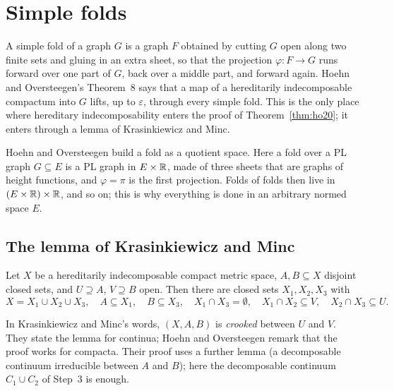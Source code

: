 \chapter{Simple folds}\label{ch:folds}

A simple fold of a graph $G$ is a graph $F$ obtained by cutting $G$ open along two finite sets and gluing in an extra sheet, so that the projection
$\varphi\colon F\to G$ runs forward over one part of $G$, back over a middle part, and forward again. Hoehn and Oversteegen's Theorem~8 says that a
map of a hereditarily indecomposable compactum into $G$ lifts, up to $\varepsilon$, through every simple fold. This is the only place where hereditary
indecomposability enters the proof of Theorem~\ref{thm:ho20}; it enters through a lemma of Krasinkiewicz and Minc.

Hoehn and Oversteegen build a fold as a quotient space. Here a fold over a PL graph $G\subseteq E$ is a PL graph in $E\times\mathbb{R}$, made of three sheets that
are graphs of height functions, and $\varphi=\pi$ is the first projection. Folds of folds then live in $(E\times\mathbb{R})\times\mathbb{R}$, and so on; this is why
everything is done in an arbitrary normed space $E$.

\section{The lemma of Krasinkiewicz and Minc}

\begin{lemma}\label{lem:km}
Let $X$ be a hereditarily indecomposable compact metric space, $A,B\subseteq X$ disjoint closed sets, and $U\supseteq A$, $V\supseteq B$ open. Then there are closed
sets $X_1,X_2,X_3$ with
\[
X=X_1\cup X_2\cup X_3,\quad A\subseteq X_1,\quad B\subseteq X_3,\quad X_1\cap X_3=\emptyset,\quad X_1\cap X_2\subseteq V,\quad X_2\cap X_3\subseteq U.
\]
\end{lemma}

In Krasinkiewicz and Minc's words, $(X,A,B)$ is \emph{crooked} between $U$ and $V$. They state the lemma for continua; Hoehn and Oversteegen remark
that the proof works for compacta. Their proof uses a further lemma (a decomposable continuum irreducible between $A$ and $B$); here the decomposable
continuum $C_1\cup C_2$ of Step~3 is enough.


